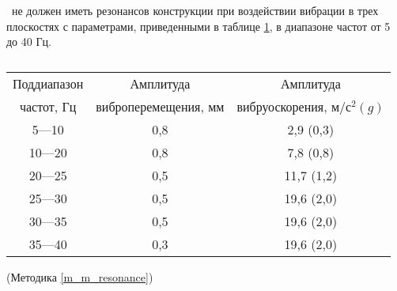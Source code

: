 \dut \ не должен иметь резонансов конструкции при воздействии вибрации в трех плоскостях с параметрами, приведенными в таблице \ref{tab:tab_resonance}, в диапазоне частот от 5 до 40 Гц.

\begin{table}[h]
\begin{center}
\caption{ }
\label{tab:tab_resonance}
\begin{tabular}{|c|c|c|} \hline
Поддиапазон                    &  Амплитуда                        &  Амплитуда                           \\ 
частот, Гц                         &  виброперемещения, мм   &  вибруоскорения, $м/с^2 (g)$ \\ \hline 
5---10                                  &  0,8                                     &  2,9 (0,3) \\ \hline
10---20                                &  0,8                                     &  7,8 (0,8) \\ \hline
20---25                                &  0,5                                     &  11,7 (1,2) \\ \hline
25---30                                &  0,5                                     &  19,6 (2,0) \\ \hline
30---35                                &  0,5                                     &  19,6 (2,0) \\ \hline
35---40                                &  0,3                                     &  19,6 (2,0) \\ \hline
\end{tabular}
\end{center}
\end{table}

\begin{flushright}
(Методика \ref{m_m_resonance})
\end{flushright}